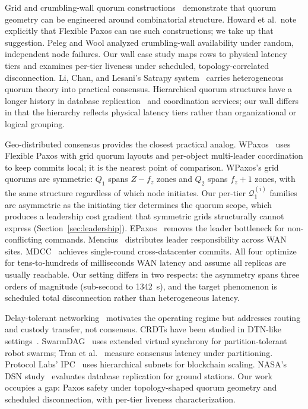 \documentclass[letterpaper,twocolumn,10pt]{article}
\newcounter{cor}
\begin{document}
Grid and crumbling-wall quorum constructions~\cite{cheung1992,peleg1995} demonstrate that quorum geometry can be engineered around combinatorial structure. Howard et al.\ note explicitly that Flexible Paxos can use such constructions; we take up that suggestion. Peleg and Wool analyzed crumbling-wall availability under random, independent node failures. Our wall case study maps rows to physical latency tiers and examines per-tier liveness under scheduled, topology-correlated disconnection. Li, Chan, and Lesani's Satrapy system~\cite{li2026satrapy} carries heterogeneous quorum theory into practical consensus. Hierarchical quorum structures have a longer history in database replication~\cite{daudjee2004} and coordination services; our wall differs in that the hierarchy reflects physical latency tiers rather than organizational or logical grouping.

Geo-distributed consensus provides the closest practical analog. WPaxos~\cite{ailijiang2019wpaxos} uses Flexible Paxos with grid quorum layouts and per-object multi-leader coordination to keep commits local; it is the nearest point of comparison. WPaxos's grid quorums are symmetric: $Q_1$ spans $Z - f_z$ zones and $Q_2$ spans $f_z + 1$ zones, with the same structure regardless of which node initiates. Our per-tier $\mathcal{Q}_1^{(i)}$ families are asymmetric as the initiating tier determines the quorum scope, which produces a leadership cost gradient that symmetric grids structurally cannot express (Section~\ref{sec:leadership}). EPaxos~\cite{moraru2013} removes the leader bottleneck for non-conflicting commands. Mencius~\cite{mao2008} distributes leader responsibility across WAN sites. MDCC~\cite{kraska2013} achieves single-round cross-datacenter commits. All four optimize for tens-to-hundreds of milliseconds WAN latency and assume all replicas are usually reachable. Our setting differs in two respects: the asymmetry spans three orders of magnitude (sub-second to 1342~s), and the target phenomenon is scheduled total disconnection rather than heterogeneous latency.

Delay-tolerant networking~\cite{cerf2007,fall2003} motivates the operating regime but addresses routing and custody transfer, not consensus. CRDTs have been studied in DTN-like settings~\cite{guidec2023}. SwarmDAG~\cite{tran2019swarmdag} uses extended virtual synchrony for partition-tolerant robot swarms; Tran et al.~\cite{tran2019milcom} measure consensus latency under partitioning. Protocol Labs' IPC~\cite{delarocha2022} uses hierarchical subnets for blockchain scaling. NASA's DSN study~\cite{connell2011} evaluates database replication for ground stations. Our work occupies a gap: Paxos safety under topology-shaped quorum geometry and scheduled disconnection, with per-tier liveness characterization.
\end{document}
